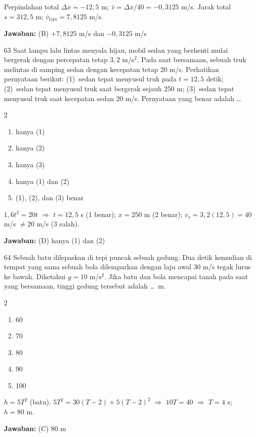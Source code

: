 \documentclass[11pt]{article}
\newenvironment{pilB}{%
  \par\smallskip\begin{multicols}{2}
  \begin{enumerate}[label=(\Alph*),leftmargin=*,itemsep=1pt,topsep=3pt]}%
  {\end{enumerate}\end{multicols}}
\newcommand{\jawaban}[1]{%
  \noindent\colorbox{gold!30}{\parbox{\dimexpr\linewidth-2\fboxsep\relax}{%
    \textbf{Jawaban:} #1}}\par\smallskip}
\begin{document}
\begin{pembox}
Perpindahan total $\Delta x=-12{,}5$ m; $\bar v=\Delta x/40=-0{,}3125$ m/s. Jarak total $s=312{,}5$ m; $\bar v_{\text{laju}}=7{,}8125$ m/s.
\jawaban{(B) $+7{,}8125$ m/s dan $-0{,}3125$ m/s}
\end{pembox}

\begin{soal}{63}
Saat lampu lalu lintas menyala hijau, mobil sedan yang berhenti mulai
bergerak dengan percepatan tetap $3{,}2$ m/s$^2$. Pada saat bersamaan,
sebuah truk melintas di samping sedan dengan kecepatan tetap 20 m/s.
Perhatikan pernyataan berikut: (1)~sedan tepat menyusul truk pada
$t=12{,}5$ detik; (2)~sedan tepat menyusul truk saat bergerak sejauh
250 m; (3)~sedan tepat menyusul truk saat kecepatan sedan 20 m/s.
Pernyataan yang benar adalah \ldots
\begin{pilB}
  \item hanya (1) \item hanya (2) \item hanya (3)
  \item hanya (1) dan (2) \item (1), (2), dan (3) benar
\end{pilB}
\end{soal}

\begin{pembox}
$1{,}6t^2=20t$ $\Rightarrow$ $t=12{,}5$ s (1 benar); $x=250$ m (2 benar); $v_s=3{,}2(12{,}5)=40$ m/s $\neq20$ m/s (3 salah).
\jawaban{(D) hanya (1) dan (2)}
\end{pembox}

\begin{soal}{64}
Sebuah batu dilepaskan di tepi puncak sebuah gedung. Dua detik kemudian
di tempat yang sama sebuah bola dilemparkan dengan laju awal 30 m/s
tegak lurus ke bawah. Diketahui $g=10$ m/s$^2$. Jika batu dan bola
mencapai tanah pada saat yang bersamaan, tinggi gedung tersebut adalah
\ldots\ m.
\begin{pilB}
  \item 60 \item 70 \item 80 \item 90 \item 100
\end{pilB}
\end{soal}

\begin{pembox}
$h=5T^2$ (batu). $5T^2=30(T-2)+5(T-2)^2$ $\Rightarrow$ $10T=40$ $\Rightarrow$ $T=4$ s; $h=80$ m.
\jawaban{(C) $80$ m}
\end{pembox}
\end{document}
